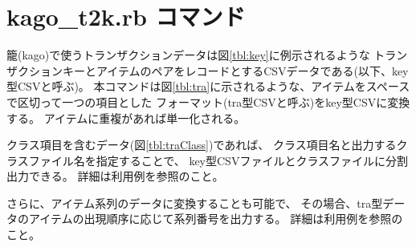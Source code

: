 \documentclass[a4paper]{jarticle}
\begin{document}
\setlength{\baselineskip}{4mm}

\section*{kago\_t2k.rb コマンド}
籠(kago)で使うトランザクションデータは図\ref{tbl:key}に例示されるような
トランザクションキーとアイテムのペアをレコードとするCSVデータである(以下、key型CSVと呼ぶ)。
本コマンドは図\ref{tbl:tra}に示されるような、アイテムをスペースで区切って一つの項目とした
フォーマット(tra型CSVと呼ぶ)をkey型CSVに変換する。
アイテムに重複があれば単一化される。

クラス項目を含むデータ(図\ref{tbl:traClass})であれば、
クラス項目名と出力するクラスファイル名を指定することで、
key型CSVファイルとクラスファイルに分割出力できる。
詳細は利用例を参照のこと。

さらに、アイテム系列のデータに変換することも可能で、
その場合、tra型データのアイテムの出現順序に応じて系列番号を出力する。
詳細は利用例を参照のこと。
\end{document}
